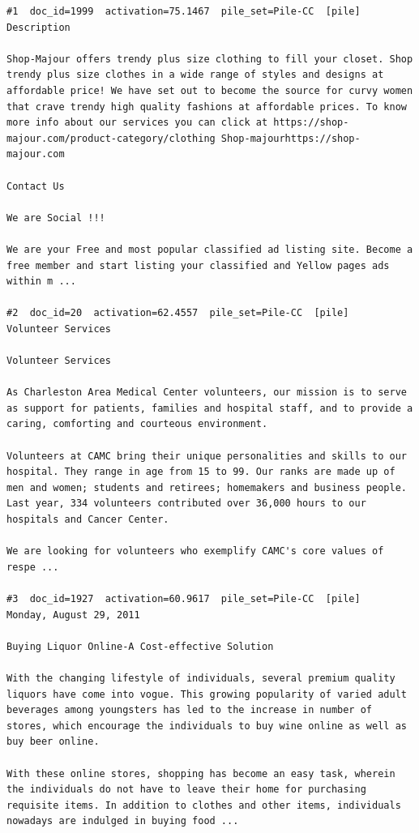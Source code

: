 \begin{verbatim}
#1  doc_id=1999  activation=75.1467  pile_set=Pile-CC  [pile]
Description

Shop-Majour offers trendy plus size clothing to fill your closet. Shop trendy plus size clothes in a wide range of styles and designs at affordable price! We have set out to become the source for curvy women that crave trendy high quality fashions at affordable prices. To know more info about our services you can click at https://shop-majour.com/product-category/clothing Shop-majourhttps://shop-majour.com

Contact Us

We are Social !!!

We are your Free and most popular classified ad listing site. Become a free member and start listing your classified and Yellow pages ads within m ...

#2  doc_id=20  activation=62.4557  pile_set=Pile-CC  [pile]
Volunteer Services

Volunteer Services

As Charleston Area Medical Center volunteers, our mission is to serve as support for patients, families and hospital staff, and to provide a caring, comforting and courteous environment.

Volunteers at CAMC bring their unique personalities and skills to our hospital. They range in age from 15 to 99. Our ranks are made up of men and women; students and retirees; homemakers and business people. Last year, 334 volunteers contributed over 36,000 hours to our hospitals and Cancer Center.

We are looking for volunteers who exemplify CAMC's core values of respe ...

#3  doc_id=1927  activation=60.9617  pile_set=Pile-CC  [pile]
Monday, August 29, 2011

Buying Liquor Online-A Cost-effective Solution

With the changing lifestyle of individuals, several premium quality liquors have come into vogue. This growing popularity of varied adult beverages among youngsters has led to the increase in number of stores, which encourage the individuals to buy wine online as well as buy beer online.

With these online stores, shopping has become an easy task, wherein the individuals do not have to leave their home for purchasing requisite items. In addition to clothes and other items, individuals nowadays are indulged in buying food ...


\end{verbatim}
